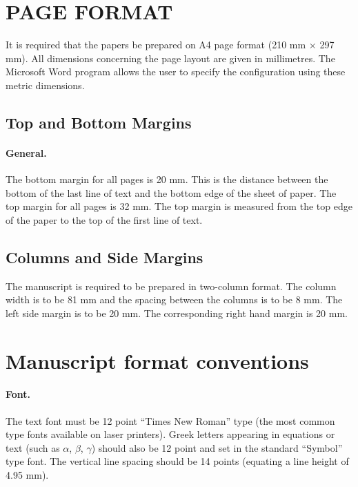 \documentclass{stabs21}
\begin{document}
\begin{multicols}{2}
\section{PAGE FORMAT}

It is required that the papers be prepared on A4 page format (210 mm
$\times$ 297 mm). All dimensions concerning the page layout are given
in millimetres. The Microsoft Word program allows the user to specify
the configuration using these metric dimensions.

\subsection{Top and Bottom Margins}

\paragraph{General.}

The bottom margin for all pages is 20 mm. This is the distance between
the bottom of the last line of text and the bottom edge of the sheet
of paper. The top margin for all pages is 32 mm. The top margin is
measured from the top edge of the paper to the top of the first line
of text.

\subsection{Columns and Side Margins}

The manuscript is required to be prepared in two-column format. The
column width is to be 81 mm and the spacing between the columns is to
be 8 mm. The left side margin is to be 20 mm. The corresponding right
hand margin is 20 mm.

\section{Manuscript format conventions}

\paragraph{Font.}

The text font must be 12 point ``Times New Roman'' type (the most
common type fonts available on laser printers). Greek letters
appearing in equations or text (such as $\alpha$, $\beta$, $\gamma$)
should also be 12 point and set in the standard ``Symbol'' type
font. The vertical line spacing should be 14 points (equating a line
height of 4.95 mm).


\end{multicols}
\end{document}
